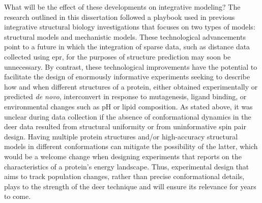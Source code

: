 What will be the effect of these developments on integrative modeling? The research outlined in this dissertation followed a playbook used in previous integrative structural biology investigations \citep*{Kazmier2014a, Paz2018} that focuses on two types of models: structural models and mechanistic models. These technological advancements point to a future in which the integration of sparse data, such as distance data collected using \gls{epr}, for the purposes of structure prediction may soon be unnecessary. By contrast, these technological improvements have the potential to facilitate the design of enormously informative experiments seeking to describe how and when different structures of a protein, either obtained experimentally or predicted \emph{de novo}, interconvert in response to mutagenesis, ligand binding, or environmental changes such as pH or lipid composition. As stated above, it was unclear during data collection if the absence of conformational dynamics in the \gls{deer} data resulted from structural uniformity or from uninformative spin pair design. Having multiple protein structures and/or high-accuracy structural models in different conformations can mitigate the possibility of the latter, which would be a welcome change when designing experiments that reports on the characteristics of a protein's energy landscape. Thus, experimental design that aims to track population changes, rather than precise conformational details, plays to the strength of the \gls{deer} technique and will ensure its relevance for years to come.